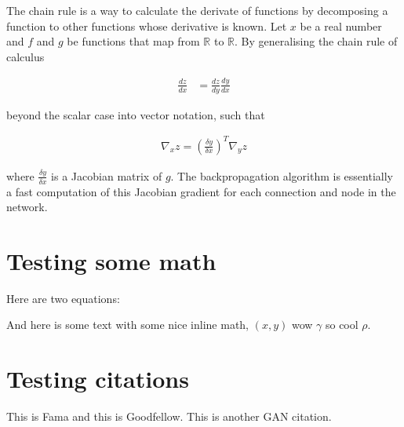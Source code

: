 \newcommand{\R}{\mathbb{R}}

The chain rule is a way to calculate the derivate of functions by decomposing a function to other functions whose derivative is known. Let $x$ be a real number and $f$ and $g$ be functions that map from $\R$ to $\R$. By generalising the chain rule of calculus

\begin{align}
    \frac{dz}{dx} &= \frac{dz}{dy}\frac{dy}{dx}
\end{align}

beyond the scalar case into vector notation, such that 

\begin{align}
    \nabla_{x}z = (\frac{\delta y}{\delta x})^T \nabla_{y}z
\end{align}

where $\frac{\delta y}{\delta x}$ is a Jacobian matrix of $g$. The backpropagation algorithm is essentially a fast computation of this Jacobian gradient for each connection and node in the network.

\section{Testing some math}
Here are two equations:





And here is some text with some nice inline math, $(x, y)$ wow $\gamma$ so cool $\rho$.


\section{Testing citations}
This is Fama and this is Goodfellow.
This is another GAN citation.